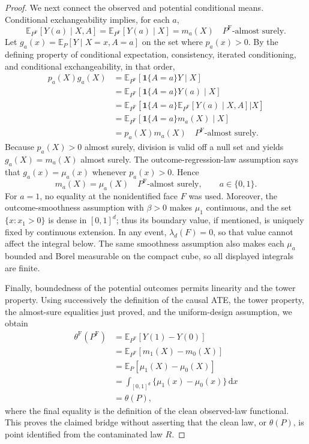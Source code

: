 \documentclass{article}
\begin{document}
\begin{proof}
We next connect the observed and potential conditional means.  Conditional
exchangeability implies, for each \(a\),
\[
\mathbb E_{P^{\mathrm F}}[Y(a)\mid X,A]
=\mathbb E_{P^{\mathrm F}}[Y(a)\mid X]
=m_a(X)
\quad P^{\mathrm F}\text{-almost surely}.
\]
Let \(g_a(x)=\mathbb E_P[Y\mid X=x,A=a]\) on the set where
\(p_a(x)>0\).  By the defining property of conditional expectation,
consistency, iterated conditioning, and conditional exchangeability, in that
order,
\[
\begin{aligned}
p_a(X)g_a(X)
&=\mathbb E_{P^{\mathrm F}}[\mathbf 1\{A=a\}Y\mid X]\\
&=\mathbb E_{P^{\mathrm F}}[\mathbf 1\{A=a\}Y(a)\mid X]\\
&=\mathbb E_{P^{\mathrm F}}\!\left[
  \mathbf 1\{A=a\}
  \mathbb E_{P^{\mathrm F}}[Y(a)\mid X,A]
  \mathrel{\big|}X\right]\\
&=\mathbb E_{P^{\mathrm F}}[\mathbf 1\{A=a\}m_a(X)\mid X]\\
&=p_a(X)m_a(X)
\quad P^{\mathrm F}\text{-almost surely}.
\end{aligned}
\]
Because \(p_a(X)>0\) almost surely, division is valid off a null set and yields
\(g_a(X)=m_a(X)\) almost surely.  The outcome-regression-law assumption says
that \(g_a(x)=\mu_a(x)\) whenever \(p_a(x)>0\).  Hence
\[
m_a(X)=\mu_a(X)
\quad P^{\mathrm F}\text{-almost surely},
\qquad a\in\{0,1\}.
\]
For \(a=1\), no equality at the nonidentified face \(F\) was used.  Moreover,
the outcome-smoothness assumption with \(\beta>0\) makes \(\mu_1\) continuous,
and the set \(\{x:x_1>0\}\) is dense in \([0,1]^d\); thus its boundary value,
if mentioned, is uniquely fixed by continuous extension.  In any event,
\(\lambda_d(F)=0\), so that value cannot affect the integral below.  The same
smoothness assumption also makes each \(\mu_a\) bounded and Borel measurable on
the compact cube, so all displayed integrals are finite.

Finally, boundedness of the potential outcomes permits linearity and the tower
property.  Using successively the definition of the causal ATE, the tower
property, the almost-sure equalities just proved, and the uniform-design
assumption, we obtain
\[
\begin{aligned}
\theta^{\mathrm F}(P^{\mathrm F})
&=\mathbb E_{P^{\mathrm F}}[Y(1)-Y(0)]\\
&=\mathbb E_{P^{\mathrm F}}[m_1(X)-m_0(X)]\\
&=\mathbb E_P[\mu_1(X)-\mu_0(X)]\\
&=\int_{[0,1]^d}\{\mu_1(x)-\mu_0(x)\}\,\mathrm dx\\
&=\theta(P),
\end{aligned}
\]
where the final equality is the definition of the clean observed-law
functional.  This proves the claimed bridge without asserting that the clean
law, or \(\theta(P)\), is point identified from the contaminated law \(R\).
\end{proof}
\end{document}
